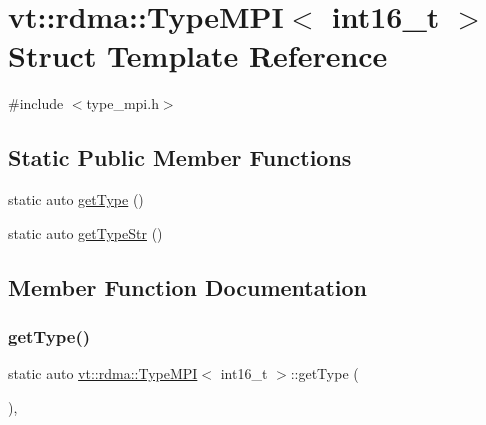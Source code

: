 \hypertarget{structvt_1_1rdma_1_1_type_m_p_i_3_01int16__t_01_4}{}\section{vt\+:\+:rdma\+:\+:Type\+M\+PI$<$ int16\+\_\+t $>$ Struct Template Reference}
\label{structvt_1_1rdma_1_1_type_m_p_i_3_01int16__t_01_4}


{\ttfamily \#include $<$type\+\_\+mpi.\+h$>$}

\subsection*{Static Public Member Functions}
\begin{DoxyCompactItemize}
\item 
static auto \hyperlink{structvt_1_1rdma_1_1_type_m_p_i_3_01int16__t_01_4_a46695fafa1444b206b4869ce291be2f3}{get\+Type} ()
\item 
static auto \hyperlink{structvt_1_1rdma_1_1_type_m_p_i_3_01int16__t_01_4_a66d15559fecf6e7e6ff76a11a9e3149c}{get\+Type\+Str} ()
\end{DoxyCompactItemize}


\subsection{Member Function Documentation}
\mbox{\label{structvt_1_1rdma_1_1_type_m_p_i_3_01int16__t_01_4_a46695fafa1444b206b4869ce291be2f3}} 
\subsubsection{\texorpdfstring{get\+Type()}{getType()}}
{\footnotesize\ttfamily static auto \hyperlink{structvt_1_1rdma_1_1_type_m_p_i}{vt\+::rdma\+::\+Type\+M\+PI}$<$ int16\+\_\+t $>$\+::get\+Type (\begin{DoxyParamCaption}{ }\end{DoxyParamCaption})\hspace{0.3cm}{\ttfamily [inline]}, {\ttfamily [static]}}

